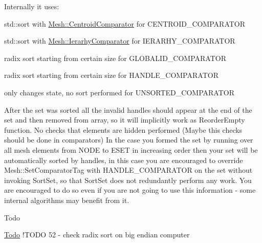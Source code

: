 Internally it uses\-:
\begin{DoxyItemize}
\item std\-::sort with \hyperlink{classINMOST_1_1Mesh_1_1CentroidComparator}{Mesh\-::\-Centroid\-Comparator} for C\-E\-N\-T\-R\-O\-I\-D\-\_\-\-C\-O\-M\-P\-A\-R\-A\-T\-O\-R
\item std\-::sort with \hyperlink{classINMOST_1_1Mesh_1_1IerarhyComparator}{Mesh\-::\-Ierarhy\-Comparator} for I\-E\-R\-A\-R\-H\-Y\-\_\-\-C\-O\-M\-P\-A\-R\-A\-T\-O\-R
\item radix sort starting from certain size for G\-L\-O\-B\-A\-L\-I\-D\-\_\-\-C\-O\-M\-P\-A\-R\-A\-T\-O\-R
\item radix sort starting from certain size for H\-A\-N\-D\-L\-E\-\_\-\-C\-O\-M\-P\-A\-R\-A\-T\-O\-R
\item only changes state, no sort performed for U\-N\-S\-O\-R\-T\-E\-D\-\_\-\-C\-O\-M\-P\-A\-R\-A\-T\-O\-R
\end{DoxyItemize}

After the set was sorted all the invalid handles should appear at the end of the set and then removed from array, so it will implicitly work as Reorder\-Empty function. No checks that elements are hidden performed (Maybe this checks should be done in comparators) In the case you formed the set by running over all mesh elements from N\-O\-D\-E to E\-S\-E\-T in increasing order then your set will be automatically sorted by handles, in this case you are encouraged to override Mesh\-::\-Set\-Comparator\-Tag with H\-A\-N\-D\-L\-E\-\_\-\-C\-O\-M\-P\-A\-R\-A\-T\-O\-R on the set without invoking Sort\-Set, so that Sort\-Set does not redundantly perform any work. You are encouraged to do so even if you are not going to use this information -\/ some internal algorithms may benefit from it.

\begin{DoxyRefDesc}{Todo}
\item[\hyperlink{todo__todo000009}{Todo}]!\-T\-O\-D\-O 52 -\/ check radix sort on big endian computer \end{DoxyRefDesc}

